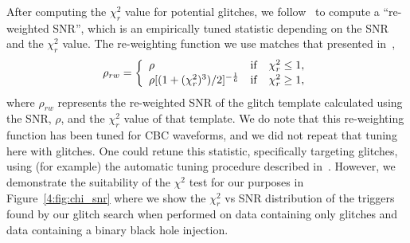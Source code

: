 After computing the $\chi_{r}^{2}$ value for potential \scladj glitches, we follow~\cite{rw_snr_eq:2012} to compute a ``re-weighted SNR'', which is an empirically tuned statistic depending on the SNR and the $\chi_{r}^{2}$ value.  The re-weighting function we use matches that presented in~\cite{rw_snr_eq:2012},
%
\begin{equation}
\rho_{rw} =  \left\{  \begin{array}{l@{\quad}cr} 
\rho & \mathrm{if} & \chi_{r}^{2} \leq 1, \\  
\rho [(1 + (\chi_{r}^{2})^3)/2]^{-\frac{1}{6}} &  \mathrm{if} & \chi_{r}^{2} \ge 1,   
\end{array}\right.
\label{4:eqn:reweighting}
\end{equation}
%
where $\rho_{rw}$ represents the re-weighted SNR of the \scladj glitch template calculated using the SNR, $\rho$, and the $\chi_{r}^{2}$ value of that template.
We do note that this re-weighting function has been tuned for CBC waveforms, and we did not repeat that tuning here with \scladj glitches. One could retune this statistic, specifically targeting \scladj glitches, using (for example) the automatic tuning procedure described in~\cite{McIsaac_Chi:2022}. However, we demonstrate the suitability of the $\chi^{2}$ test for our purposes in Figure~\ref{4:fig:chi_snr} where we show the $\chi_{r}^{2}$ vs SNR distribution of the triggers found by our \scladj glitch search when performed on data containing only \scladj glitches and data containing a binary black hole \gwadj injection.

